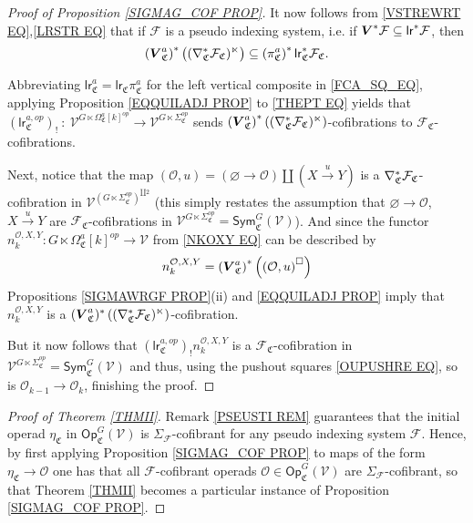 \documentclass[a4paper,10pt
,draft
]{article}%
\numberwithin{equation}{section}
\numberwithin{figure}{section}
\theoremstyle{definition} %
\newcommand{\F}{\ensuremath{\mathcal F}}
\newcommand{\V}{\ensuremath{\mathcal V}}
\renewcommand{\O}{\ensuremath{\mathcal O}}
\newcommand{\1}{\ensuremath{\mathbbm 1}}%
\begin{document}
\begin{proof}[Proof of Proposition \ref{SIGMAG_COF PROP}]
It now follows from \eqref{VSTREWRT EQ},\eqref{LRSTR EQ}
that if $\F$ is a pseudo indexing system,
i.e. if 
$\boldsymbol{V}^{\**} \F 
	\subseteq 
\mathsf{lr}^{\**} \F$,
then
\begin{equation}\label{THEPT EQ}
	\left(\boldsymbol{V}_{\mathfrak C}^{a}\right)^{\**} \left( (\nabla_{\mathfrak C}^{\**} \F_{\mathfrak C})^\ltimes \right)
\subseteq
\left(\pi_{\mathfrak C}^a\right)^{\**} \mathsf{lr}_{\mathfrak C}^{\**} \F_{\mathfrak C}.
\end{equation}


Abbreviating 
$\mathsf{lr}_{\mathfrak{C}}^a
=
\mathsf{lr}_{\mathfrak{C}} \pi^a_{\mathfrak{C}}$
for the left vertical composite in \eqref{FCA_SQ_EQ},
applying Proposition \ref{EQQUILADJ PROP}
to \eqref{THEPT EQ}
yields that 
$
\left(\mathsf{lr}^{a,op}_{\mathfrak{C}}\right)_!
\ \colon \
\V^{G \ltimes \Omega_{\mathfrak C}^{a}[k]^{op}}
\to
\V^{G \ltimes \Sigma_{\mathfrak C}^{op}}
$
sends 
$\left(\boldsymbol{V}_{\mathfrak C}^{a}\right)^{\**}\left( (\nabla_{\mathfrak C}^{\**} \F_{\mathfrak C})^\ltimes \right)$-cofibrations
to
$\F_{\mathfrak C}$-cofibrations.

Next, notice that the map
$(\O,u) = (\varnothing \to \O) \amalg (X \xrightarrow{u} Y)$
is a $\nabla_{\mathfrak C}^{\**}\F_{\mathfrak C}$-cofibration
in $\V^{(G \ltimes \Sigma_{\mathfrak C}^{op})^{\amalg 2}}$
(this simply restates the assumption that
$\varnothing \to \O$, $X \xrightarrow{u} Y$ 
are $\F_{\mathfrak{C}}$-cofibrations
in $\V^{G \ltimes \Sigma_{\mathfrak C}^{op}} = \mathsf{Sym}_{\mathfrak{C}}^G(\V)$).
And since the functor $n_k^{\O,X,Y} \colon G \ltimes \Omega_{\mathfrak C}^{a}[k]^{op} \to \V$ from \eqref{NKOXY EQ}
can be described by
\[
n_k^{\O,X,Y} = \left( \boldsymbol{V}_{\mathfrak C}^{a}\right)^{\**}
\left( \left(\O,u\right)^{\square} \right)
\]
Propositions \ref{SIGMAWRGF PROP}(ii) and \ref{EQQUILADJ PROP}
imply that $n_k^{\O,X,Y}$ is a 
$(\boldsymbol{V}_{\mathfrak C}^{a})^{\**}\left( (\nabla_{\mathfrak C}^{\**} \F_{\mathfrak C})^\ltimes \right)$-cofibration.

But it now follows that 
$\left(\mathsf{lr}^{a,op}_{\mathfrak{C}}\right)_! n_k^{\O,X,Y}$
is a $\F_{\mathfrak{C}}$-cofibration
in $\V^{G \ltimes \Sigma_{\mathfrak C}^{op}} = \mathsf{Sym}_{\mathfrak{C}}^G(\V)$
and thus,
using the pushout squares \eqref{OUPUSHRE EQ},
so is $\O_{k-1} \to \O_k$,
finishing the proof.
\end{proof}



\begin{proof}[Proof of Theorem \ref{THMII}]
	Remark \ref{PSEUSTI REM}
	guarantees that the initial operad 
	$\eta_{\mathfrak{C}}$
	in $\mathsf{Op}^G_{\mathfrak{C}}(\V)$
	is $\Sigma_{\F}$-cofibrant for any
	pseudo indexing system $\F$.
	Hence, by first applying Proposition \ref{SIGMAG_COF PROP}
	to maps of the form $\eta_{\mathfrak{C}} \to \O$
	one has that all $\F$-cofibrant operads
	$\O \in \mathsf{Op}^G_{\mathfrak{C}}(\V)$
	are $\Sigma_{\F}$-cofibrant,
	so that Theorem \ref{THMII} becomes a particular instance of 
	Proposition \ref{SIGMAG_COF PROP}.
\end{proof}
\end{document}
